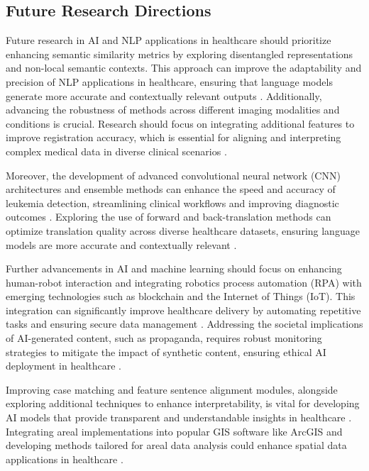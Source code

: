 \subsection{Future Research Directions} \label{subsec:Future Research Directions}

Future research in AI and NLP applications in healthcare should prioritize enhancing semantic similarity metrics by exploring disentangled representations and non-local semantic contexts. This approach can improve the adaptability and precision of NLP applications in healthcare, ensuring that language models generate more accurate and contextually relevant outputs \cite{yamshchikov2020styletransferparaphraselookingsensible}. Additionally, advancing the robustness of methods across different imaging modalities and conditions is crucial. Research should focus on integrating additional features to improve registration accuracy, which is essential for aligning and interpreting complex medical data in diverse clinical scenarios \cite{wang2024unsupervisedmultimodal3dmedical}.



Moreover, the development of advanced convolutional neural network (CNN) architectures and ensemble methods can enhance the speed and accuracy of leukemia detection, streamlining clinical workflows and improving diagnostic outcomes \cite{zolfaghari2023surveyautomateddetectionclassification}. Exploring the use of forward and back-translation methods can optimize translation quality across diverse healthcare datasets, ensuring language models are more accurate and contextually relevant \cite{bogoychev2020domaintranslationesenoisesynthetic}.



Further advancements in AI and machine learning should focus on enhancing human-robot interaction and integrating robotics process automation (RPA) with emerging technologies such as blockchain and the Internet of Things (IoT). This integration can significantly improve healthcare delivery by automating repetitive tasks and ensuring secure data management \cite{pandy2024advancementsroboticsprocessautomation}. Addressing the societal implications of AI-generated content, such as propaganda, requires robust monitoring strategies to mitigate the impact of synthetic content, ensuring ethical AI deployment in healthcare \cite{mcguffie2020radicalizationrisksgpt3advanced}.



Improving case matching and feature sentence alignment modules, alongside exploring additional techniques to enhance interpretability, is vital for developing AI models that provide transparent and understandable insights in healthcare \cite{lin2023interpretabilityframeworksimilarcase}. Integrating areal implementations into popular GIS software like ArcGIS and developing methods tailored for areal data analysis could enhance spatial data applications in healthcare \cite{vidanapathirana2022clusterdetectioncapabilitiesaverage}.



